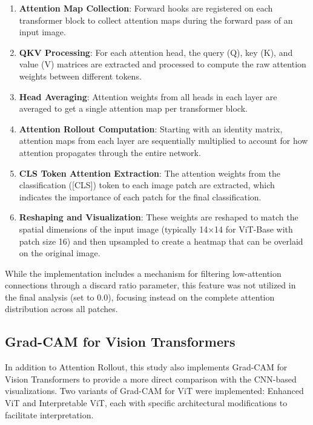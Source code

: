 \documentclass[a4paper,12pt]{report}
\begin{document}
\begin{enumerate}
    \item \textbf{Attention Map Collection}: Forward hooks are registered on each transformer block to collect attention maps during the forward pass of an input image.
    
    \item \textbf{QKV Processing}: For each attention head, the query (Q), key (K), and value (V) matrices are extracted and processed to compute the raw attention weights between different tokens.
    
    \item \textbf{Head Averaging}: Attention weights from all heads in each layer are averaged to get a single attention map per transformer block.
    
    \item \textbf{Attention Rollout Computation}: Starting with an identity matrix, attention maps from each layer are sequentially multiplied to account for how attention propagates through the entire network.
    
    \item \textbf{CLS Token Attention Extraction}: The attention weights from the classification ([CLS]) token to each image patch are extracted, which indicates the importance of each patch for the final classification.
    
    \item \textbf{Reshaping and Visualization}: These weights are reshaped to match the spatial dimensions of the input image (typically 14×14 for ViT-Base with patch size 16) and then upsampled to create a heatmap that can be overlaid on the original image.
\end{enumerate}

While the implementation includes a mechanism for filtering low-attention connections through a discard ratio parameter, this feature was not utilized in the final analysis (set to 0.0), focusing instead on the complete attention distribution across all patches.

\subsection{Grad-CAM for Vision Transformers}

In addition to Attention Rollout, this study also implements Grad-CAM for Vision Transformers to provide a more direct comparison with the CNN-based visualizations. Two variants of Grad-CAM for ViT were implemented: Enhanced ViT and Interpretable ViT, each with specific architectural modifications to facilitate interpretation.
\end{document}
